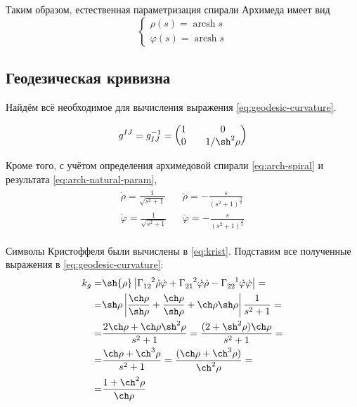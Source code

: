 \documentclass{article}
\numberwithin{equation}{section}
\renewcommand{\phi}{\varphi}
\newcommand{\krist}[3]{\Gamma^{\phantom{#1 #2}#3}_{#1 #2}}
\DeclareMathOperator{\arcsh}{arcsh}
\providecommand{\abs}[1]{\left \lvert{#1}\right \rvert}
\begin{document}
Таким образом, естественная параметризация спирали Архимеда имеет вид
\begin{equation}\label{eq:arch-natural-param}
  \begin{cases}
    \rho(s) = \arcsh{s} \\
    \phi(s) = \arcsh{s}
  \end{cases}
\end{equation}

\subsection{Геодезическая кривизна}

Найдём всё необходимое для вычисления выражения
\eqref{eq:geodesic-curvature}.

\begin{equation*}
  g^{IJ} = g_{IJ}^{-1} = \begin{pmatrix} 1 && 0 \\ 0 && 1/\sh^2{\rho} \end{pmatrix}
\end{equation*}

Кроме того, с учётом определения архимедовой спирали
\eqref{eq:arch-spiral} и результата \eqref{eq:arch-natural-param},
\begin{gather}
  \begin{align*}
    \dot{\rho} = \frac{1}{\sqrt{s^2+1}} && \ddot{\rho} = -\frac{s}{(s^2+1)^{\frac{3}{2}}}\\
    \dot{\phi} = \frac{1}{\sqrt{s^2+1}} && \ddot{\phi} = -\frac{s}{(s^2+1)^{\frac{3}{2}}}
  \end{align*}
\end{gather}

Символы Кристоффеля были вычислены в \eqref{eq:krist}. Подставим все
полученные выражения в \eqref{eq:geodesic-curvature}:
\begin{equation}\label{eq:arch-geo-curvature}
  \begin{split}
    k_g =& \sh{\rho} \abs{\krist{1}{2}{2} \dot{\rho} \dot{\phi} +
      \krist{2}{1}{2} \dot{\phi} \dot{\rho} - \krist{2}{2}{1} \dot{\phi}
      \dot {\phi}}= \\
    =& \sh\rho \abs{\frac{\ch\rho}{\sh\rho} +
      \frac{\ch\rho}{\sh\rho} + \ch\rho \sh\rho} \frac{1}{s^2+1} = \\
    =& \frac{2\ch\rho + \ch\rho \sh^2\rho}{s^2+1}
    = \frac{(2+\sh^2\rho)\ch\rho}{s^2+1} = \\
    =& \frac{\ch\rho + \ch^3\rho}{s^2+1} =
    \frac{(\ch\rho+\ch^3\rho)}{\ch^2\rho} = \\
    =& \frac{1 + \ch^2\rho}{\ch\rho}
  \end{split}
\end{equation}
\end{document}
